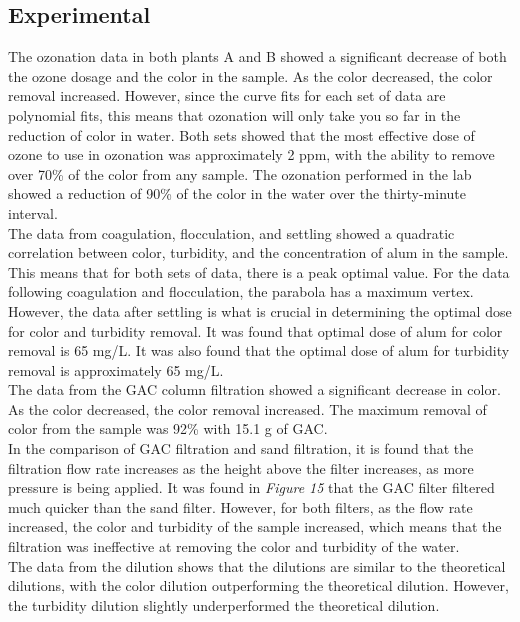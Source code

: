 \documentclass{article}
\begin{document}
    \subsection{Experimental}
    \indent The ozonation data in both plants A and B showed a significant decrease of both the ozone dosage and the color in the sample. As the color decreased, the color removal increased. However, since the curve fits for each set of data are polynomial fits, this means that ozonation will only take you so far in the reduction of color in water. Both sets showed that the most effective dose of ozone to use in ozonation was approximately 2 ppm, with the ability to remove over 70\% of the color from any sample. The ozonation performed in the lab showed a reduction of 90\% of the color in the water over the thirty-minute interval. \\
    \indent The data from coagulation, flocculation, and settling showed a quadratic correlation between color, turbidity, and the concentration of alum in the sample. This means that for both sets of data, there is a peak optimal value. For the data following coagulation and flocculation, the parabola has a maximum vertex. However, the data after settling is what is crucial in determining the optimal dose for color and turbidity removal. It was found that optimal dose of alum for color removal is 65 mg/L. It was also found that the optimal dose of alum for turbidity removal is approximately 65 mg/L.\\
    \indent The data from the GAC column filtration showed a significant decrease in color. As the color decreased, the color removal increased. The maximum removal of color from the sample was 92\% with 15.1 g of GAC.\\
    \indent In the comparison of GAC filtration and sand filtration, it is found that the filtration flow rate increases as the height above the filter increases, as more pressure is being applied. It was found in \emph{Figure 15} that the GAC filter filtered much quicker than the sand filter. However, for both filters, as the flow rate increased, the color and turbidity of the sample increased, which means that the filtration was ineffective at removing the color and turbidity of the water.\\
    \indent The data from the dilution shows that the dilutions are similar to the theoretical dilutions, with the color dilution outperforming the theoretical dilution. However, the turbidity dilution slightly underperformed the theoretical dilution.
    \newpage
\end{document}
